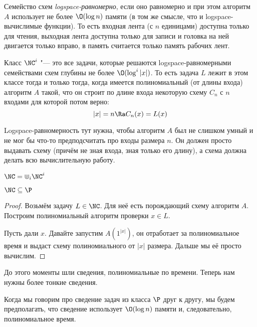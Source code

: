 	\begin{Def}
		Семейство схем \textit{logspace-равномерно}, если оно равномерно и при этом алгоритм $A$ использует не более $\O(\log n)$ памяти (в том же смысле, что и logspace-вычислимые функции).
		То есть входная лента (с $n$ единицами) доступна только для чтения, выходная лента доступна только для записи и головка на ней двигается только вправо,
		в память считается только память рабочих лент.
	\end{Def}
	\begin{Def}
		Класс $\NC^i$ "--- это все задачи, которые решаются logspace-равномерными семействами схем глубины не более $\O(\log^i |x|)$.
		То есть задача $L$ лежит в этом классе тогда и только тогда, когда имеется полиномиальный (от длины входа) алгоритм $A$ такой,
		что он строит по длине входа некоторую схему $C_n$ с $n$ входами для которой потом верно:
		\[
			|x| = n \Ra C_n(x) = L(x)
		\]
	\end{Def}
	\begin{Rem}
		Logspace-равномерность тут нужна, чтобы алгоритм $A$ был не слишком умный и не мог бы что-то предподсчитать про входы размера $n$.
		Он должен просто выдавать схему (причём не зная входа, зная только его длину), а схема должна делать всю вычислительную работу.
	\end{Rem}
	\begin{Def}
		$\NC = \Cup_i \NC^i$
	\end{Def}

	\begin{lemma}
		$\NC \subseteq \P$
	\end{lemma}
	\begin{proof}
		Возьмём задачу $L \in \NC$.
		Для неё есть порождающий схему алгоритм $A$.
		Построим полиномиальный алгоритм проверки $x \in L$.

		Пусть дали $x$.
		Давайте запустим $A(1^{|x|})$, он отработает за полиномиальное время и выдаст схему полиномиального от $|x|$ размера.
		Дальше мы её просто вычислим.
	\end{proof}

	\begin{Rem}
		До этого моменты шли сведения, полиномиальные по времени.
		Теперь нам нужны более тонкие сведения.
	\end{Rem}
	\begin{Def}
		Когда мы говорим про сведение задач из класса $\P$ друг к другу, мы будем предполагать, что
		сведение использует $\O(\log n)$ памяти и, следовательно, полиномиальное время.
	\end{Def}

